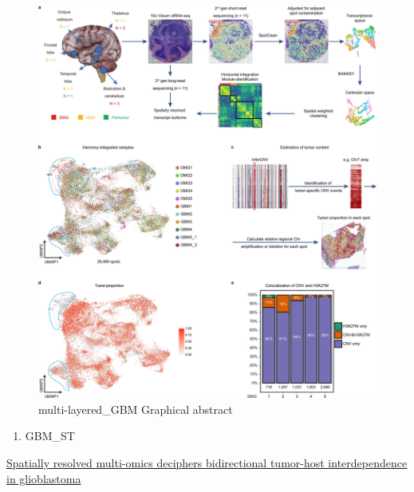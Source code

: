 \documentclass[
]{book}
\providecommand{\tightlist}{%
  \setlength{\itemsep}{0pt}\setlength{\parskip}{0pt}}
\begin{document}
\begin{figure}
\centering
\includegraphics{./figs/spatialDatasets/DMG_GBM_dataset.webp}
\caption{multi-layered\_GBM Graphical abstract}
\end{figure}

\begin{enumerate}
\def\labelenumi{\arabic{enumi}.}
\setcounter{enumi}{1}
\tightlist
\item
  GBM\_ST
\end{enumerate}

\href{https://www.sciencedirect.com/science/article/pii/S1535610822002203?ref=pdf_download\&fr=RR-2\&rr=82a4735d0c8f20e1}{Spatially resolved multi-omics deciphers bidirectional tumor-host interdependence in glioblastoma}
\end{document}
